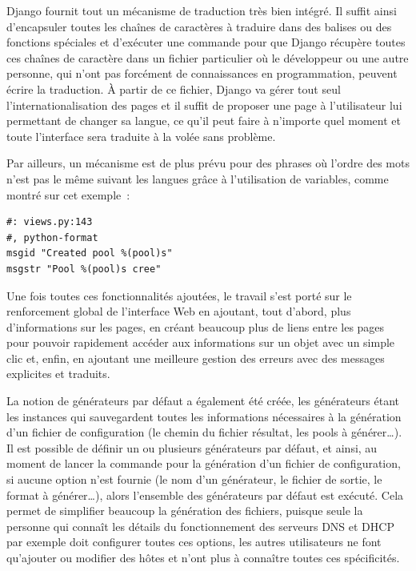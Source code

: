\documentclass[12pt,a4paper,twoside]{report}
\begin{document}
Django fournit tout un mécanisme de traduction très bien intégré. Il suffit
ainsi d’encapsuler toutes les chaînes de caractères à traduire dans des balises
ou des fonctions spéciales et d’exécuter une commande pour que Django récupère
toutes ces chaînes de caractère dans un fichier particulier où le développeur
ou une autre personne, qui n’ont pas forcément de connaissances en
programmation, peuvent écrire la traduction. À partir de ce fichier, Django va
gérer tout seul l’internationalisation des pages et il suffit de proposer une
page à l’utilisateur lui permettant de changer sa langue, ce qu’il peut faire à
n’importe quel moment et toute l’interface sera traduite à la volée sans
problème.

Par ailleurs, un mécanisme est de plus prévu pour des phrases où l’ordre des
mots n’est pas le même suivant les langues grâce à l’utilisation de variables,
comme montré sur cet exemple~:

\begin{lstlisting}
#: views.py:143
#, python-format
msgid "Created pool %(pool)s"
msgstr "Pool %(pool)s cree"
\end{lstlisting}

Une fois toutes ces fonctionnalités ajoutées, le travail s’est porté sur le
renforcement global de l’interface Web en ajoutant, tout d’abord, plus
d’informations sur les pages, en créant beaucoup plus de liens entre les pages
pour pouvoir rapidement accéder aux informations sur un objet avec un simple
clic et, enfin, en ajoutant une meilleure gestion des erreurs avec des
messages explicites et traduits.

La notion de générateurs par défaut a également été créée, les générateurs
étant les instances qui sauvegardent toutes les informations nécessaires à la
génération d’un fichier de configuration (le chemin du fichier résultat, les
pools à générer\dots). Il est possible de définir un ou plusieurs générateurs
par défaut, et ainsi, au moment de lancer la commande pour la génération d’un
fichier de configuration, si aucune option n’est fournie (le nom d’un
générateur, le fichier de sortie, le format à générer\dots), alors l’ensemble
des générateurs par défaut est exécuté. Cela permet de simplifier beaucoup la
génération des fichiers, puisque seule la personne qui connaît les détails du
fonctionnement des serveurs DNS et DHCP par exemple doit configurer toutes ces
options, les autres utilisateurs ne font qu’ajouter ou modifier des hôtes et
n’ont plus à connaître toutes ces spécificités.\\
\end{document}
